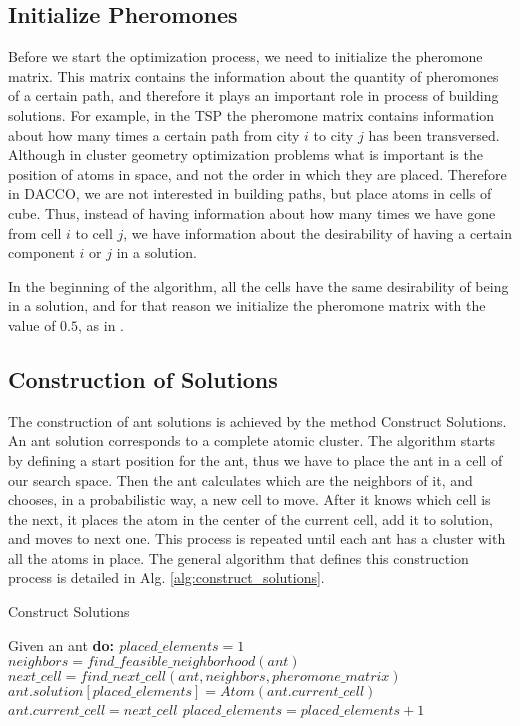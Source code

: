 	\subsection{Initialize Pheromones}
	Before we start the optimization process, we need to initialize the pheromone matrix. This matrix contains the information about the quantity of pheromones of a certain path, and therefore it plays an important role in process of building solutions. For example, in the TSP the pheromone matrix contains information about how many times a certain path from city $i$ to city $j$ has been transversed.\\
	Although in cluster geometry optimization problems what is important is the position of atoms in space, and not the order in which they are placed. Therefore in DACCO, we are not interested in building paths, but place atoms in cells of cube. Thus, instead of having information about how many times we have gone from cell $i$ to cell $j$, we have information about the desirability of having a certain component $i$ or $j$ in a solution.
	
	In the beginning of the algorithm, all the cells have the same desirability of being in a solution, and for that reason we initialize the pheromone matrix with the value of $0.5$, as in \cite{blum04}.
	
	
	\subsection{Construction of Solutions}
	The construction of ant solutions is achieved by the method Construct Solutions. An ant solution corresponds to a complete atomic cluster. The algorithm starts by defining a start position for the ant, thus we have to place the ant in a cell of our search space. Then the ant calculates which are the neighbors of it, and chooses, in a probabilistic way, a new cell to move. After it knows which cell is the next, it places the atom in the center of the current cell, add it to solution, and moves to next one. This process is repeated until each ant has a cluster with all the atoms in place. The general algorithm that defines this construction process is detailed in Alg. \ref{alg:construct_solutions}.
	
	\begin{algorithm}
		\caption{Construct Solutions}
		\label{alg:construct_solutions}
		\begin{algorithmic}
		\STATE Given an ant \bf{do}:
		\STATE $placed\_elements = 1$
			\STATE $neighbors = find\_feasible\_neighborhood(ant)$
			\STATE $next\_cell = find\_next\_cell(ant, neighbors, pheromone\_matrix)$
			\STATE $ant.solution[placed\_elements] = Atom(ant.current\_cell)$
			\STATE $ant.current\_cell = next\_cell$
			\STATE $placed\_elements = placed\_elements + 1$			
		\ENDWHILE
		\end{algorithmic}
	\end{algorithm}
	
